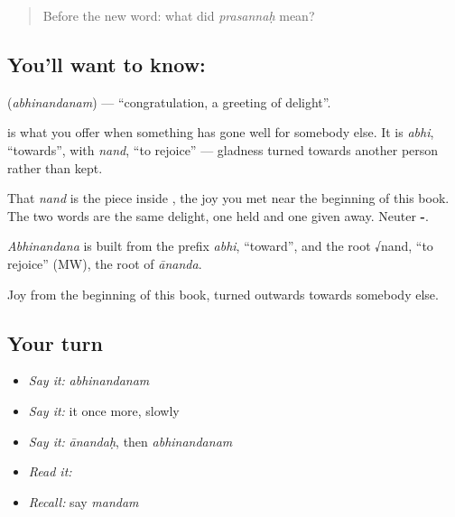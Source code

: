 \label{lesson:SA-C37-congratulations}



\begin{quote}
Before the new word: what did \emph{prasannaḥ} mean?
\end{quote}

\subsection*{You'll want to know: }
\textbf{} (\emph{abhinandanam}) — \textquotedblleft{}congratulation, a greeting of delight\textquotedblright{}.

\textbf{} is what you offer when something has gone well for somebody else. It is \emph{abhi}, \textquotedblleft{}towards\textquotedblright{}, with \emph{nand}, \textquotedblleft{}to rejoice\textquotedblright{} — gladness turned towards another person rather than kept.

That \emph{nand} is the piece inside \textbf{}, the joy you met near the beginning of this book. The two words are the same delight, one held and one given away. Neuter \textbf{-}.

\begin{cousinweb}
\emph{Abhinandana} is built from the prefix \emph{abhi}, \textquotedblleft{}toward\textquotedblright{}, and the root √nand, \textquotedblleft{}to rejoice\textquotedblright{} (MW), the root of \emph{ānanda}.
\end{cousinweb}

\begin{grammarlens}[title={What you've built}]
Joy from the beginning of this book, turned outwards towards somebody else.
\end{grammarlens}

\subsection*{Your turn}
\begin{itemize}
\raggedright
  \item \emph{Say it:} \emph{abhinandanam}
  \item \emph{Say it:} it once more, slowly
  \item \emph{Say it:} \emph{ānandaḥ}, then \emph{abhinandanam}
  \item \emph{Read it:} \textbf{}
  \item \emph{Recall:} say \emph{mandam}
\end{itemize}

